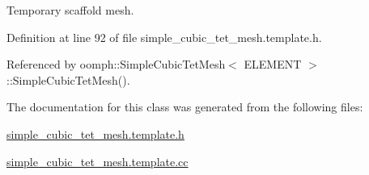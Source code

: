Temporary scaffold mesh. 



Definition at line 92 of file simple\+\_\+cubic\+\_\+tet\+\_\+mesh.\+template.\+h.



Referenced by oomph\+::\+Simple\+Cubic\+Tet\+Mesh$<$ E\+L\+E\+M\+E\+N\+T $>$\+::\+Simple\+Cubic\+Tet\+Mesh().



The documentation for this class was generated from the following files\+:\begin{DoxyCompactItemize}
\item 
\hyperlink{simple__cubic__tet__mesh_8template_8h}{simple\+\_\+cubic\+\_\+tet\+\_\+mesh.\+template.\+h}\item 
\hyperlink{simple__cubic__tet__mesh_8template_8cc}{simple\+\_\+cubic\+\_\+tet\+\_\+mesh.\+template.\+cc}\end{DoxyCompactItemize}
